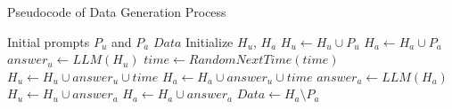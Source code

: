 \begin{algorithm}[ht]
    \caption{Pseudocode of Data Generation Process}
    \label{alg:data_generation}
    \begin{algorithmic}[1]
        \REQUIRE Initial prompts $P_u$ and $P_a$
        \ENSURE $Data$
        \STATE Initialize $H_u$, $H_a$
        \STATE $H_u \leftarrow H_u \cup P_u$
        \STATE $H_a \leftarrow H_a \cup P_a$
            \STATE $answer_u \leftarrow LLM(H_u)$
            \STATE $time \leftarrow RandomNextTime(time)$
            \STATE $H_u \leftarrow H_u \cup answer_u \cup time$
            \STATE $H_a \leftarrow H_a \cup answer_u \cup time$
            \STATE $answer_a \leftarrow LLM(H_a)$
            \STATE $H_u \leftarrow H_u \cup answer_a$
            \STATE $H_a \leftarrow H_a \cup answer_a$
        \ENDWHILE
        \STATE $Data \leftarrow H_a \setminus P_a$
    \end{algorithmic}
\end{algorithm}


